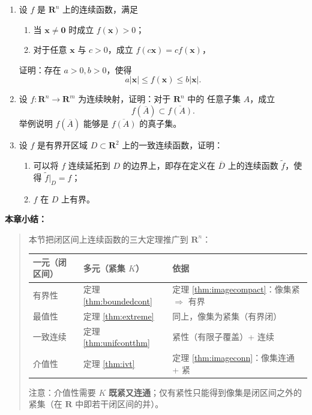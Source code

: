 \documentclass[11pt]{ctexart}
\newenvironment{chaptersummary}
  {\par\medskip\noindent\textbf{本章小结：}\begin{quote}}
  {\end{quote}}
\theoremstyle{plain}
\theoremstyle{definition}
\theoremstyle{remark}
\begin{document}
\begin{enumerate}
\begin{enumerate}
        \end{enumerate}
  \item 设 \(f\) 是 \(\mathbf{R}^n\) 上的连续函数，满足
        \begin{enumerate}
          \item[(1)] 当 \(\boldsymbol{x}\neq\boldsymbol{0}\) 时成立 \(f(\boldsymbol{x})>0\)；
          \item[(2)] 对于任意 \(\boldsymbol{x}\) 与 \(c>0\)，成立 \(f(c\boldsymbol{x})=cf(\boldsymbol{x})\)，
        \end{enumerate}
        证明：存在 \(a>0,b>0\)，使得
        \[
          a|\boldsymbol{x}|\le f(\boldsymbol{x})\le b|\boldsymbol{x}| .
        \]
  \item 设 \(f\colon\mathbf{R}^n\to\mathbf{R}^m\) 为连续映射，证明：对于 \(\mathbf{R}^n\) 中的
        任意子集 \(A\)，成立
        \[
          f(\overline{A})\subset\overline{f(A)} .
        \]
        举例说明 \(f(\overline{A})\) 能够是 \(\overline{f(A)}\) 的真子集。
  \item 设 \(f\) 是有界开区域 \(D\subset\mathbf{R}^2\) 上的一致连续函数，证明：
        \begin{enumerate}
          \item[(1)] 可以将 \(f\) 连续延拓到 \(D\) 的边界上，即存在定义在
                \(\overline{D}\) 上的连续函数 \(\widetilde{f}\)，使得
                \(\widetilde{f}\big|_D=f\)；
          \item[(2)] \(f\) 在 \(D\) 上有界。
        \end{enumerate}
\end{enumerate}

\begin{chaptersummary}
本节把闭区间上连续函数的三大定理推广到 \(\mathbf{R}^n\)：
\begin{center}
\begin{tabular}{lll}
  \toprule
  一元（闭区间） & 多元（紧集 \(K\)） & 依据 \\
  \midrule
  有界性 & 定理 \ref{thm:boundedcont} & 定理 \ref{thm:imagecompact}：像集紧 $\Rightarrow$ 有界 \\
  最值性 & 定理 \ref{thm:extreme} & 同上，像集为紧集（有界闭） \\
  一致连续 & 定理 \ref{thm:unifcontthm} & 紧性（有限子覆盖）+ 连续 \\
  介值性 & 定理 \ref{thm:ivt} & 定理 \ref{thm:imageconn}：像集连通 + 紧 \\
  \bottomrule
\end{tabular}
\end{center}
注意：介值性需要 \(K\) \textbf{既紧又连通}；仅有紧性只能得到像集是闭区间之外的
紧集（在 \(\mathbf{R}\) 中即若干闭区间的并）。
\end{chaptersummary}
\end{document}
